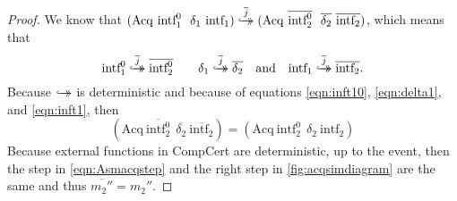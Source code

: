 \begin{proof}
We know that $(\mathrm{Acq }\ \text{intf}_1^0\   \ \delta_1\ \text{intf}_1) \overset{\overline{j}}{\hookrightarrow\mathrel{\mspace{-15mu}}\rightarrow} (\mathrm{Acq }\ \overline{\text{intf}_2^0}\   \ \overline{\delta_2} \ \overline{\text{intf}_2}) $, which means that 
\begin{equation*}
\text{intf}_1^0 \strinjarrow{\overline{j}} \overline{\text{intf}_2^0}  \qquad
\delta_1 \strinjarrow{\overline{j}} \overline{\delta_2} \quad \text{and} \quad 
\text{intf}_1 \strinjarrow{\overline{j}} \overline{\text{intf}_2}. 
\end{equation*}
Because $\overset{}{\hookrightarrow\mathrel{\mspace{-15mu}}\rightarrow}$ is deterministic and because of equations \ref{eqn:inft10}, \ref{eqn:delta1}, and \ref{eqn:inft1}, then 
\begin{equation*}
(\mathrm{Acq }\ \overline{\text{intf}_2^0}\   \ \overline{\delta_2} \ \overline{\text{intf}_2}) = (\mathrm{Acq }\ {\text{intf}_2^0}\   \ {\delta_2} \ {\text{intf}_2}) 
\end{equation*}
Because external functions in CompCert are deterministic, up to the event, then the step in \cref{eqn:Asmacqstep} and the right step in \cref{fig:acqsimdiagram} are the same and thus $\overline{m_2''} = m_2''$. 
\end{proof}
